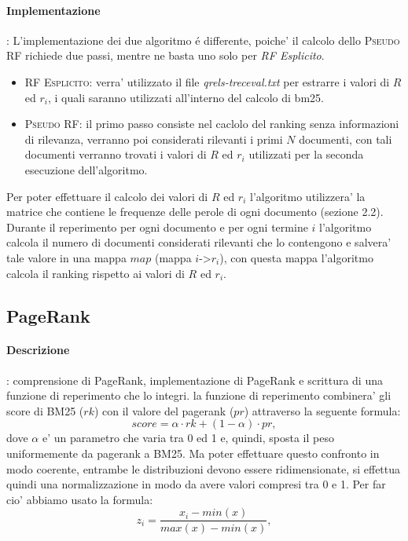 \paragraph{\textbf{Implementazione}}: 
L'implementazione dei due algoritmo \'e differente, poiche' il calcolo dello \textsc{Pseudo RF} richiede due passi, mentre ne basta uno solo per \textit{RF Esplicito}.
\begin{itemize}
\item \textsc{RF Esplicito}: verra' utilizzato il file \textit{qrels-treceval.txt} per estrarre i valori di $R$ ed $r_i$, i quali saranno utilizzati all'interno del calcolo di bm25.
\item \textsc{Pseudo RF}: il primo passo consiste nel caclolo del ranking senza informazioni di rilevanza, verranno poi considerati rilevanti i primi $N$ documenti, con tali documenti verranno trovati i valori di $R$ ed $r_i$ utilizzati per la seconda esecuzione dell'algoritmo.
\end{itemize}
Per poter effettuare il calcolo dei valori di $R$ ed $r_i$ l'algoritmo utilizzera' la matrice che contiene le frequenze delle perole di ogni documento (sezione 2.2). Durante il reperimento per ogni documento e per ogni termine $i$ l'algoritmo calcola il numero di documenti considerati rilevanti che lo contengono e salvera' tale valore in una mappa $map$ (mappa $i$->$r_i$), con questa mappa l'algoritmo calcola il ranking rispetto ai valori di $R$ ed $r_i$.



\subsection{PageRank}
\label{sec:pagerank}

\paragraph{\textbf{Descrizione}}: comprensione di PageRank, implementazione di PageRank e scrittura di una funzione di reperimento che lo integri.
la funzione di reperimento combinera' gli score di BM25 ($rk$) con il valore del pagerank ($pr$) attraverso la seguente formula:
\[ score =  \alpha \cdot rk + (1-\alpha) \cdot pr,\]
dove $\alpha$ e' un parametro che varia tra 0 ed 1 e, quindi, sposta il peso uniformemente da pagerank a BM25.
Ma poter effettuare questo confronto in modo coerente, entrambe le distribuzioni devono essere ridimensionate, si effettua quindi una normalizzazione in modo da avere valori compresi tra 0 e 1. Per far cio' abbiamo usato la formula:
\[ z_i = \frac{x_i - min(x)}{max(x) - min(x)}, \]


